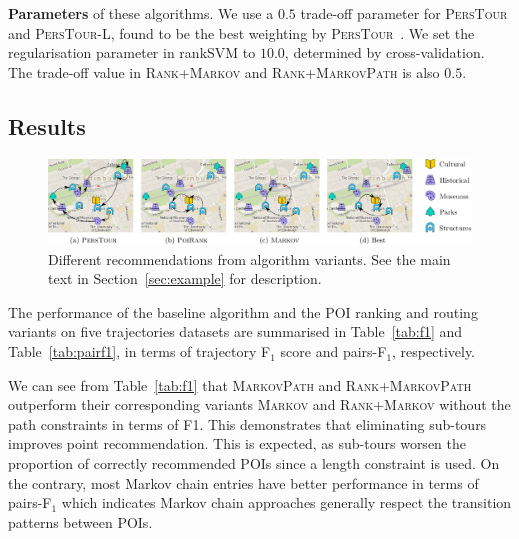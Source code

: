 {\bf Parameters} of these algorithms.
We use a $0.5$ trade-off parameter for \textsc{PersTour} and \textsc{PersTour-L},
found to be the best weighting by \textsc{PersTour}~\cite{ijcai15}.
We set the regularisation parameter in rankSVM to  $10.0$, determined by cross-validation.
The trade-off value in \textsc{Rank+Markov} and \textsc{Rank+MarkovPath} is also $0.5$.


\subsection{Results}
\label{sec:result}
\secmoveup

%
\begin{figure}[t]
	\centering
	\includegraphics[width=\textwidth]{fig/example-tour.pdf}
	\caption{Different recommendations from algorithm variants.
    See the main text in Section~\ref{sec:example} for description.}
	\label{fig:exampleresult}
	\captionmoveup
\end{figure}



The performance of the baseline algorithm and the POI ranking and routing variants
on five trajectories datasets are summarised in Table~\ref{tab:f1}
and Table~\ref{tab:pairf1}, in terms of trajectory F$_1$ score and pairs-F$_1$, respectively.


We can see from Table~\ref{tab:f1} that \textsc{MarkovPath} and \textsc{Rank+MarkovPath}
outperform their corresponding variants \textsc{Markov} and \textsc{Rank+Markov} without the path constraints in terms of F1.
This demonstrates that eliminating sub-tours improves point recommendation.
This is expected, as sub-tours worsen the proportion of correctly
recommended POIs since a length constraint is used.
On the contrary, most Markov chain entries have better performance in terms of pairs-F$_1$
which indicates Markov chain approaches generally
respect the transition patterns between POIs.
%


